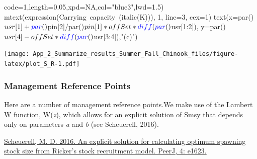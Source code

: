 \documentclass[
  11pt,
]{article}
\newenvironment{Shaded}{}{}
\newcommand{\DataTypeTok}[1]{#1}
\newcommand{\DecValTok}[1]{#1}
\newcommand{\FloatTok}[1]{#1}
\newcommand{\KeywordTok}[1]{\textcolor[rgb]{0.00,0.00,1.00}{#1}}
\newcommand{\NormalTok}[1]{#1}
\newcommand{\OperatorTok}[1]{#1}
\newcommand{\OtherTok}[1]{\textcolor[rgb]{1.00,0.25,0.00}{#1}}
\newcommand{\StringTok}[1]{\textcolor[rgb]{0.00,0.50,0.50}{#1}}
\begin{document}
\begin{Shaded}
\begin{Highlighting}[]
       \DataTypeTok{code=}\DecValTok{1}\NormalTok{,}\DataTypeTok{length=}\FloatTok{0.05}\NormalTok{,}\DataTypeTok{xpd=}\OtherTok{NA}\NormalTok{,}\DataTypeTok{col=}\StringTok{"blue3"}\NormalTok{,}\DataTypeTok{lwd=}\FloatTok{1.5}\NormalTok{)}
\KeywordTok{mtext}\NormalTok{(}\KeywordTok{expression}\NormalTok{(Carrying}\OperatorTok{~}\NormalTok{capacity}\OperatorTok{~}\NormalTok{(}\KeywordTok{italic}\NormalTok{(K))), }\DecValTok{1}\NormalTok{, }\DataTypeTok{line=}\DecValTok{3}\NormalTok{, }\DataTypeTok{cex=}\DecValTok{1}\NormalTok{)}
\KeywordTok{text}\NormalTok{(}\DataTypeTok{x=}\KeywordTok{par}\NormalTok{()}\OperatorTok{$}\NormalTok{usr[}\DecValTok{1}\NormalTok{]}\OperatorTok{+}\KeywordTok{par}\NormalTok{()}\OperatorTok{$}\NormalTok{pin[}\DecValTok{2}\NormalTok{]}\OperatorTok{/}\KeywordTok{par}\NormalTok{()}\OperatorTok{$}\NormalTok{pin[}\DecValTok{1}\NormalTok{]}\OperatorTok{*}\NormalTok{offSet}\OperatorTok{*}\KeywordTok{diff}\NormalTok{(}\KeywordTok{par}\NormalTok{()}\OperatorTok{$}\NormalTok{usr[}\DecValTok{1}\OperatorTok{:}\DecValTok{2}\NormalTok{]),}
     \DataTypeTok{y=}\KeywordTok{par}\NormalTok{()}\OperatorTok{$}\NormalTok{usr[}\DecValTok{4}\NormalTok{]}\OperatorTok{-}\NormalTok{offSet}\OperatorTok{*}\KeywordTok{diff}\NormalTok{(}\KeywordTok{par}\NormalTok{()}\OperatorTok{$}\NormalTok{usr[}\DecValTok{3}\OperatorTok{:}\DecValTok{4}\NormalTok{]),}\StringTok{"(c)"}\NormalTok{)}
\end{Highlighting}
\end{Shaded}

\texttt{[image: App\_2\_Summarize\_results\_Summer\_Fall\_Chinook\_files/figure-latex/plot\_S\_R-1.pdf]}

\hypertarget{management-reference-points}{%
\subsubsection{Management Reference
Points}\label{management-reference-points}}

Here are a number of management reference points.We make use of the
Lambert W function, W(\emph{z}), which allows for an explicit solution
of Smsy that depends only on parameters \emph{a} and \emph{b} (see
Scheuerell, 2016).

\href{https://peerj.com/articles/1623/}{Scheuerell, M. D. 2016. An
explicit solution for calculating optimum spawning stock size from
Ricker's stock recruitment model. PeerJ, 4: e1623.}
\end{document}
